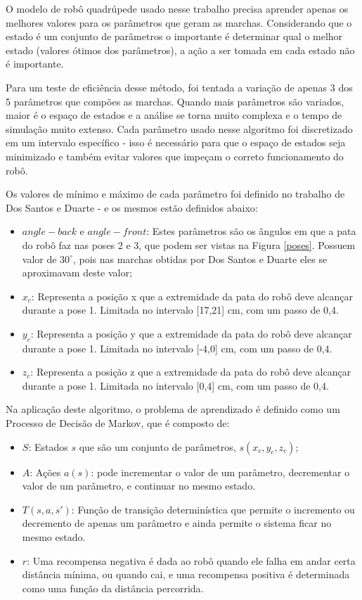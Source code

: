 \documentclass[12pt]{report}
\begin{document}
O modelo de robô quadrúpede usado nesse trabalho precisa aprender apenas os melhores valores para os parâmetros que geram as marchas. Considerando que o estado é um conjunto de parâmetros o importante é determinar qual o melhor estado (valores ótimos dos parâmetros), a ação a ser tomada em cada estado não é importante.

Para um teste de eficiência desse método, foi tentada a variação de apenas 3 dos 5 parâmetros que compões as marchas. Quando mais parâmetros são variados, maior é o espaço de estados e a análise se torna muito complexa e o tempo de simulação muito extenso. Cada parâmetro usado nesse algoritmo foi discretizado em um intervalo específico - isso é necessário para que o espaço de estados seja minimizado e também evitar valores que impeçam o correto funcionamento do robô.

Os valores de mínimo e máximo de cada parâmetro foi definido no trabalho de Dos Santos e Duarte \cite{2} - e os mesmos estão definidos abaixo:

\begin{itemize}
    \item $angle-back$ e $angle-front$: Estes parâmetros são os ângulos em que a pata do robô faz nas poses 2 e 3, que podem ser vistas na Figura \ref{poses}. Possuem valor de $30^{\circ}$, pois nas marchas obtidas por Dos Santos e Duarte \cite{2} eles se aproximavam deste valor;
    \item $x_c$: Representa a posição x que a extremidade da pata do robô deve alcançar durante a pose 1. Limitada no intervalo [17,21] cm, com um passo de 0,4.
    \item $y_c$: Representa a posição y que a extremidade da pata do robô deve alcançar durante a pose 1. Limitada no intervalo [-4,0] cm, com um passo de 0,4.
    \item $z_c$: Representa a posição z que a extremidade da pata do robô deve alcançar durante a pose 1. Limitada no intervalo [0,4] cm, com um passo de 0,4.
\end{itemize}

Na aplicação deste algoritmo, o problema de aprendizado é definido como um Processo de Decisão de Markov, que é composto de:

\begin{itemize}
    \item $S$: Estados $s$ que são um conjunto de parâmetros, $s(x_{c},y_{c}, z_{c})$;
    \item $A$: Ações $a(s)$: pode incrementar o valor de um parâmetro, decrementar o valor de um parâmetro, e continuar no mesmo estado.
    \item $T(s,a,s')$: Função de transição determinística que permite o incremento ou decremento de apenas um parâmetro e ainda permite o sistema ficar no mesmo estado.
    \item $r$: Uma recompensa negativa é dada ao robô quando ele falha em andar certa distância mínima, ou quando cai, e uma recompensa positiva é determinada como uma função da distância percorrida.  
\end{itemize}
\end{document}
